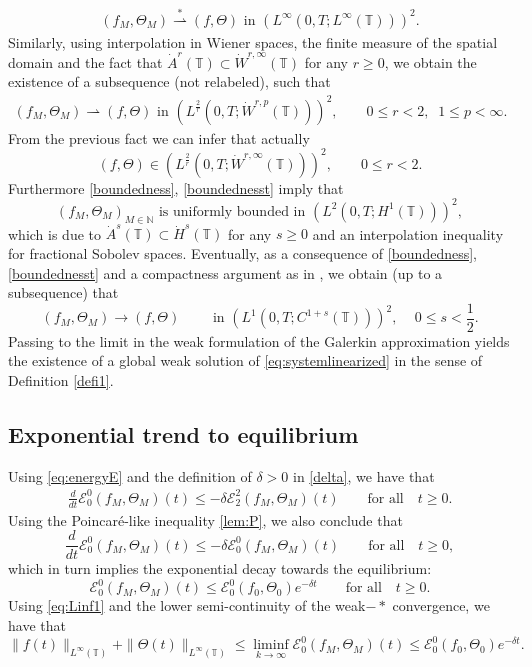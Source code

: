 \documentclass[reqno,11pt]{amsart}
\newcommand{\NN}{{\mathbb N}}
\newcommand{\TT}{{\mathbb T}}
\begin{document}
{\begin{align*}
(f_M,\Theta_M)\overset{*}{\rightharpoonup}  (f,\Theta)\text {  in $\left(L^{\infty}(0,T;L^\infty(\TT))\right)^2$}.
\end{align*}
Similarly, using interpolation in Wiener spaces, the finite measure of the spatial domain and the fact that $\dot A^r(\TT)\subset \dot W^{r,\infty}(\TT)$ for any $r\geq 0$, we obtain the existence of a subsequence (not relabeled), such that
\begin{align}\label{eq:Linf1}
(f_M,\Theta_M)\rightharpoonup  (f,\Theta)\text {   in $\left(L^{\frac{2}{r}}(0,T;\dot W^{r,p}(\TT))\right)^2$},\qquad 0\leq r<2,\;\;1\leq p<\infty.
\end{align}
From the previous fact we can infer that actually
$$
(f,\Theta) \in \left(L^{\frac{2}{r}}(0,T;\dot W^{r,\infty}(\TT))\right)^2,\qquad 0\leq r<2.
$$
Furthermore \eqref{boundedness}, \eqref{boundednesst} imply that
$$
	(f_M,\Theta_M)_{M\in\NN} \text{ is uniformly bounded in }   \left(L^2(0,T;H^{1}(\TT))\right)^2,
$$
which is due to $\dot A^s(\TT)\subset \dot H^s(\TT)$ for any $s \geq 0$ and an interpolation inequality for fractional Sobolev spaces. Eventually, as a consequence of \eqref{boundedness},\eqref{boundednesst} and a  compactness argument as in \cite[Corollary 4]{simon1986compact}, we obtain (up to a subsequence) that
$$
(f_M,\Theta_M)\rightarrow (f,\Theta)\qquad \text{ in $\left(L^1(0,T;{C}^{1+s}(\TT))\right)^2$}, \quad \,0\leq s<\frac{1}{2}.
$$
Passing to the limit in the weak formulation of the Galerkin approximation yields the existence of a global weak solution of \eqref{eq:systemlinearized} in the sense of Definition \ref{defi1}.

\subsection{Exponential trend to equilibrium}\label{ss:decay} Using \eqref{eq:energyE} and the definition of $\delta>0$ in \eqref{delta}, we have that
\begin{align}\label{eq:expdecay}
\frac{d}{dt}\mathscr{E}^0_0(f_M,\Theta_M)(t)\leq -\delta\mathscr{E}^2_2(f_M,\Theta_M)(t) \qquad \mbox{for all}\quad t\geq0.
\end{align}
Using the Poincar\'e-like inequality \eqref{lem:P}, we also conclude that 
$$
\frac{d}{dt}\mathscr{E}^0_0(f_M,\Theta_M)(t)\leq -\delta\mathscr{E}^0_0(f_M,\Theta_M)(t) \qquad \mbox{for all}\quad t\geq0,
$$ 
 which in turn implies the exponential decay towards the equilibrium:
\[
\mathscr{E}^0_0(f_M,\Theta_M)(t)\leq \mathscr{E}_0^0(f_0,\Theta_0)e^{-\delta t}\qquad \mbox{for all}\quad t\geq0.
\]
Using \eqref{eq:Linf1} and the lower semi-continuity of the weak$-*$ convergence, we have that
\begin{equation*}
\|f(t)\|_{L^\infty(\TT)}+\|\Theta(t)\|_{L^\infty(\TT)}\leq \liminf_{k\to \infty}\mathscr{E}_0^0(f_M,\Theta_M)(t)\leq 	\mathscr{E}_0^0(f_0,\Theta_0)e^{-\delta t}.
\end{equation*}

}
\end{document}
